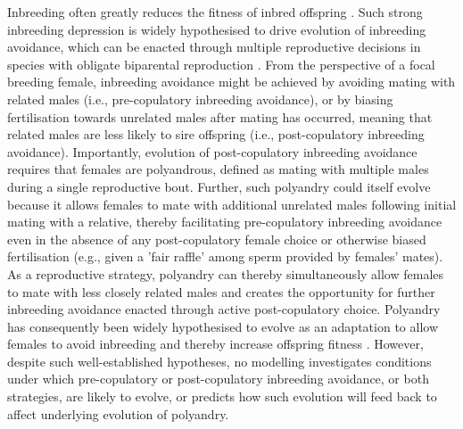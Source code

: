 \documentclass[10pt,letterpaper]{article}
\begin{document}
Inbreeding often greatly reduces the fitness of inbred offspring \cite[termed `inbreeding depression';][]{Charlesworth1999, Keller2002, Charlesworth2009}. Such strong inbreeding depression is widely hypothesised to drive evolution of inbreeding avoidance, which can be enacted through multiple reproductive decisions in species with obligate biparental reproduction \cite[][]{Parker1979, Parker2006, Pusey1996, Szulkin2012}. From the perspective of a focal breeding female, inbreeding avoidance might be achieved by avoiding mating with related males (i.e., pre-copulatory inbreeding avoidance), or by biasing fertilisation towards unrelated males after mating has occurred, meaning that related males are less likely to sire offspring (i.e., post-copulatory inbreeding avoidance). Importantly, evolution of post-copulatory inbreeding avoidance requires that females are polyandrous, defined as mating with multiple males during a single reproductive bout. Further, such polyandry could itself evolve because it allows females to mate with additional unrelated males following initial mating with a relative, thereby facilitating pre-copulatory inbreeding avoidance even in the absence of any post-copulatory female choice or otherwise biased fertilisation (e.g., given a 'fair raffle' among sperm provided by females' mates). As a reproductive strategy, polyandry can thereby simultaneously allow females to mate with less closely related males and creates the opportunity for further inbreeding avoidance enacted through active post-copulatory choice. Polyandry has consequently been widely hypothesised to evolve as an adaptation to allow females to avoid inbreeding and thereby increase offspring fitness \cite[][]{Zeh1997, Jennions2000, Tregenza2002, Akcay2007}. However, despite such well-established hypotheses, no modelling investigates conditions under which pre-copulatory or post-copulatory inbreeding avoidance, or both strategies, are likely to evolve, or predicts how such evolution will feed back to affect underlying evolution of polyandry.
\end{document}
